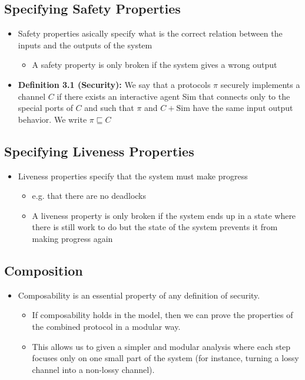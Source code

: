 \documentclass[11pt]{article}
\begin{document}
\subsection{Specifying Safety Properties}
\label{sec:org1606852}
\begin{itemize}
\item Safety properties asically specify what is the correct relation between the inputs and the outputs of the system
\begin{itemize}
\item A safety property is only broken if the system gives a wrong output
\end{itemize}

\item \textbf{Definition 3.1 (Security):} We say that a protocols \(\pi\) securely implements a channel \(C\) if there exists an interactive agent Sim that connects only to the special ports of \(C\) and such that \(\pi\) and \(C+\text{Sim}\) have the same input output behavior. We write \(\pi \sqsubseteq C\)
\end{itemize}

\subsection{Specifying Liveness Properties}
\label{sec:orga8cfc85}
\begin{itemize}
\item Liveness properties specify that the system must make progress
\begin{itemize}
\item e.g. that there are no deadlocks
\item A liveness property is only broken if the system ends up in a state where there is still work to do but the state of the system prevents it from making progress again
\end{itemize}
\end{itemize}

\subsection{Composition}
\label{sec:orgb6d9e1b}
\begin{itemize}
\item Composability is an essential property of any definition of security.
\begin{itemize}
\item If composability holds in the model, then we can prove the properties of the combined protocol in a modular way.
\item This allows us to given a simpler and modular analysis where each step focuses only on one small part of the system (for instance, turning a lossy channel into a non-lossy channel).
\end{itemize}
\end{itemize}
\end{document}
